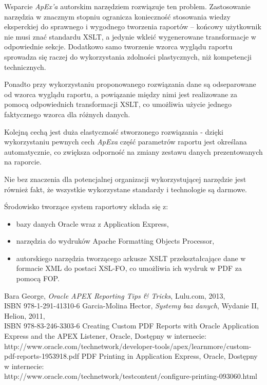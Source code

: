 \documentclass[11pt,a4paper]{article}
\begin{document}
Wsparcie \emph{ApEx'a} autorskim narzędziem rozwiązuje ten problem. Zastosowanie narzędzia w znacznym stopniu ogranicza konieczność stosowania wiedzy eksperckiej do sprawnego i wygodnego tworzenia raportów -- końcowy użytkownik nie musi znać standardu XSLT, a jedynie wkleić wygenerowane transformacje w odpowiednie sekcje. Dodatkowo samo tworzenie wzorca wyglądu raportu sprowadza się raczej do wykorzystania zdolności plastycznych, niż kompetencji technicznych.

Ponadto przy wykorzystaniu proponowanego rozwiązania dane są odseparowane od wzorca wyglądu raportu, a powiązanie między nimi jest realizowane za pomocą odpowiednich transformacji XSLT, co umożliwia użycie jednego faktycznego wzorca dla różnych danych.  

Kolejną cechą jest duża elastyczność stworzonego rozwiązania - dzięki wykorzystaniu pewnych cech \emph{ApExa} część parametrów raportu jest określana automatycznie, co zwiększa odporność na zmiany zestawu danych prezentowanych na raporcie. 

Nie bez znaczenia dla potencjalnej organizacji wykorzystującej narzędzie jest również fakt, że wszystkie wykorzystane standardy i technologie są darmowe. 

\bigskip
Środowisko tworzące system raportowy składa się z:
\begin{itemize}
	\item bazy danych Oracle wraz z Application Express,
	\item narzędzia do wydruków Apache Formatting Objects Processor,
	\item autorskiego narzędzia tworzącego arkusze XSLT przekształcające dane w formacie XML do postaci XSL-FO, co umożliwia ich wydruk w PDF za pomocą FOP.
\end{itemize}

\newpage

\begin{thebibliography}{9}

 Bara George, \emph{Oracle APEX Reporting Tips \& Tricks}, Lulu.com, 2013,\\ISBN 978-1-291-41310-6
 Garcia-Molina Hector, \emph{Systemy baz danych}, Wydanie II, Helion, 2011,\\ ISBN 978-83-246-3303-6
 Creating Custom PDF Reports with Oracle Application Express and the APEX Listener, Oracle, Dostępny w internecie:\\http://www.oracle.com/technetwork/developer-tools/apex/learnmore/custom-pdf-reports-1953918.pdf
 PDF Printing in Application Express, Oracle, Dostępny w internecie: \\http://www.oracle.com/technetwork/testcontent/configure-printing-093060.html
\end{thebibliography}
\newpage
\end{document}
